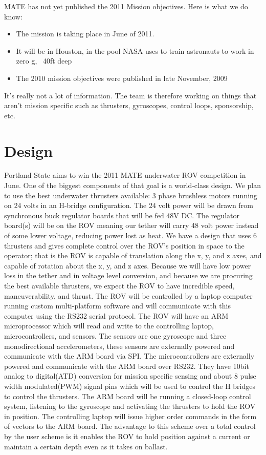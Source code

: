 \documentclass{proposalnsf}
\begin{document}
MATE has not yet published the 2011 Mission objectives. Here is what we do know:
\begin{itemize}
\item The mission is taking place in June of 2011.
\item It will be in Houston, in the pool NASA uses to train astronauts to work in zero g, ~40ft deep
\item The 2010 mission objectives were published in late November, 2009
\end{itemize}
It's really not a lot of information. The team is therefore working on things that aren't mission specific such as thrusters, gyroscopes, control loops, sponsorship, etc.


\section{Design}
Portland State aims to win the 2011 MATE underwater ROV competition in June. One of the biggest components of that goal is a world-class design. We plan to use the best underwater thrusters available: 3 phase brushless motors running on 24 volts in an H-bridge configuration. The 24 volt power will be drawn from synchronous buck regulator boards that will be fed 48V DC. The regulator board(s) will be on the ROV meaning our tether will carry 48 volt power instead of some lower voltage, reducing power lost as heat. We have a design that uses 6 thrusters and gives complete control over the ROV’s position in space to the operator; that is the ROV is capable of translation along the x, y, and z axes, and capable of rotation about the x, y, and z axes. Because we will have low power loss in the tether and in voltage level conversion, and because we are procuring the best available thrusters, we expect the ROV to have incredible speed, maneuverability, and thrust. The ROV will be controlled by a laptop computer running custom multi-platform software and will communicate with this computer using the RS232 serial protocol. The ROV will have an ARM microprocessor which will read and write to the controlling laptop, microcontrollers, and sensors. The sensors are one gyroscope and three monodirectional accelerometers, these sensors are externally powered and communicate with the ARM board via SPI. The microcontrollers are externally powered and communicate with the ARM board over RS232. They have 10bit analog to digital(ATD) conversion for mission specific sensing and about 8 pulse width modulated(PWM) signal pins which will be used to control the H bridges to control the thrusters. The ARM board will be running a closed-loop control system, listening to the gyroscope and activating the thrusters to hold the ROV in position. The controlling laptop will issue higher order commands in the form of vectors to the ARM board. The advantage to this scheme over a total control by the user scheme is it enables the ROV to hold position against a current or maintain a certain depth even as it takes on ballast.
\end{document}

